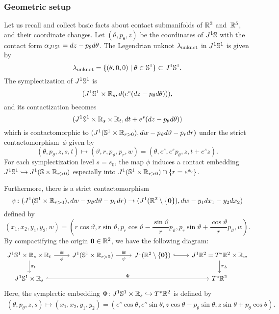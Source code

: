 \subsubsection{Geometric setup}\label{sec:geometric setup}
Let us recall and collect basic facts about contact submanifolds of $\mathbb{R}^3$ and~$\mathbb{R}^5$, and their coordinate changes.
Let $(\theta, p_\theta, z)$ be the coordinates of $J^1\mathbb{S}$ with the contact form $\alpha_{J^1\mathbb{S}^1}=dz-p_\theta d\theta$.
The Legendrian unknot $\lambda_{\rm unknot}$ in $J^1\mathbb{S}^1$ is given by
\[
\lambda_{\rm unknot}=\{ (\theta,0,0) \mid \theta \in \mathbb{S}^1\}\subset J^1\mathbb{S}^1.
\]
The symplectization of $J^1\mathbb{S}^1$ is 
\[(J^1\mathbb{S}^1\times \mathbb{R}_s,d(e^s(dz-p_\theta d\theta))),\] 
and its contactization becomes 
\[
(J^1\mathbb{S}^1\times \mathbb{R}_s \times \mathbb{R}_t,dt+e^s(dz-p_\theta d\theta))\] 
which is contactomorphic to $(J^1(\mathbb{S}^1\times \mathbb{R}_{r>0}), dw-p_\vartheta d\vartheta-p_r dr)$ under the strict contactomorphism~$\phi$ given by
\[
(\theta,p_\theta,z,s,t)\mapsto(\vartheta, r, p_\vartheta, p_r, w)=(\theta, e^s, e^s p_\theta, z, t+ e^s z).
\]
For each symplectization level $s=s_0$, the map $\phi$ induces a contact embedding $J^1\mathbb{S}^1 \hookrightarrow J^1(\mathbb{S}\times \mathbb{R}_{r>0})$ especially into $J^1(\mathbb{S}^1 \times \mathbb{R}_{r>0})\cap \{r=e^{s_0}\}$.

Furthermore, there is a strict contactomorphism
\[
\psi \colon (J^1(\mathbb{S}^1\times \mathbb{R}_{r>0}), dw-p_\vartheta d\vartheta-p_r dr) \to (J^1(\mathbb{R}^2\setminus\{{\bf 0}\}),dw-y_1dx_1-y_2dx_2)
\]
defined by
\[
(x_1,x_2,y_1,y_2,w)=\left(r \cos\vartheta,r\sin\vartheta, p_r \cos\vartheta -\frac{\sin\vartheta}{r}p_\vartheta, p_r \sin\vartheta + \frac{\cos\vartheta}{r}p_\vartheta,w\right).
\]
By compactifying the origin ${\bf 0}\in \mathbb{R}^2$, we have the following diagram:
\[
\begin{tikzcd}
J^1\sphere^1\times\mathbb{R}_s\times\mathbb{R}_t \arrow[r, "\cong", "\phi"'] \arrow[d,"\pi_t"] & 
J^1(\sphere^1\times\mathbb{R}_{r>0})\arrow[r,"\cong","\psi"'] &
J^1(\mathbb{R}^2\setminus\{\mathbf{0}\})\arrow[r, hookrightarrow] &
J^1\mathbb{R}^2=T^*\R^2\times \R_w \arrow[d,"\pi_L"]\\
J^1\sphere^1\times \R_s \arrow[rrr,hookrightarrow,"\Phi"] & & & T^*\R^2
\end{tikzcd}
\]
Here, the symplectic embedding $\Phi\colon J^1\mathbb{S}^1\times \mathbb{R}_s \hookrightarrow T^*\mathbb{R}^2$ is defined by
\begin{align*}
(\theta, p_\theta, z, s)\mapsto (x_1, x_2, y_1, y_2)=(e^s\cos\theta, e^s\sin\theta, z\cos\theta-p_\theta\sin\theta, z\sin\theta+p_\theta\cos\theta).
\end{align*}

